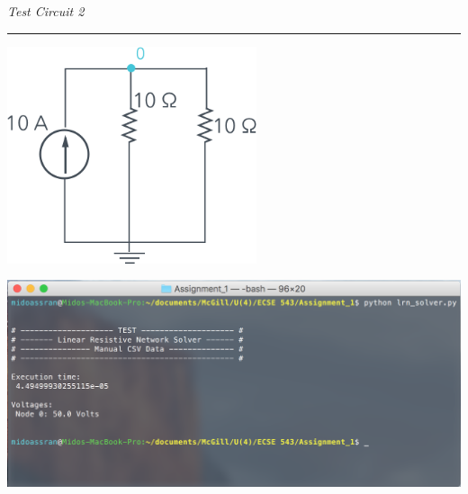 \documentclass[11pt]{amsart}
\begin{document}
\begin{minipage}{\textwidth}
    \textit{Test Circuit 2}\\
    \noindent\rule[0.5ex]{\linewidth}{0.5pt}
\end{minipage}
\begin{minipage}{0.3\textwidth}
\end{minipage}
\begin{minipage}{0.7\textwidth}
	\begin{center}
		\vspace{2em}
        		\includegraphics[width=0.55\textwidth]{assets/sk_test_c2.png}
	\end{center}
\end{minipage}
\begin{minipage}{\textwidth}
	\vspace{2em}
	\centering
	\includegraphics[width=\textwidth]{assets/test_c2.png}
\end{minipage}
\pagebreak
\end{document}
